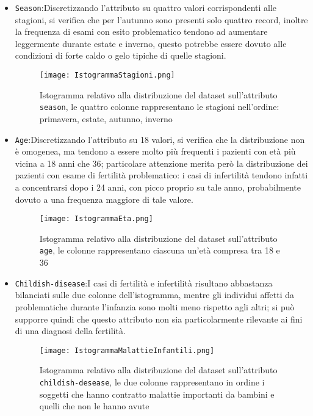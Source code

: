 \begin{itemize}
	\item \texttt{Season}:Discretizzando l'attributo su quattro valori corrispondenti alle stagioni, si verifica che per l'autunno sono presenti solo quattro record, inoltre la frequenza di esami con esito problematico tendono ad aumentare leggermente durante estate e inverno, questo potrebbe essere dovuto alle condizioni di forte caldo o gelo tipiche di quelle stagioni.
	\begin{figure}[H]
		\texttt{[image: IstogrammaStagioni.png]}
		\caption{Istogramma relativo alla distribuzione del dataset sull'attributo \texttt{season}, le quattro colonne rappresentano le stagioni nell'ordine: primavera, estate, autunno, inverno}
	\end{figure}
	
	\item \texttt{Age}:Discretizzando l'attributo su 18 valori, si verifica che la distribuzione non è omogenea, ma tendono a essere molto più frequenti i pazienti con età più vicina a 18 anni che  36; particolare attenzione merita però la distribuzione dei pazienti con esame di fertilità problematico: i casi di infertilità tendono infatti a concentrarsi dopo i 24 anni, con picco proprio su tale anno, probabilmente dovuto a una frequenza maggiore di tale valore.
	
		\begin{figure}[H]
		\texttt{[image: IstogrammaEta.png]}
		\caption{Istogramma relativo alla distribuzione del dataset sull'attributo \texttt{age}, le colonne rappresentano ciascuna un'età compresa tra 18 e 36}
	\end{figure}
	
	\item \texttt{Childish-disease}:I casi di fertilità e infertilità risultano abbastanza bilanciati sulle due colonne dell'istogramma, mentre gli individui affetti da problematiche durante l'infanzia sono molti meno rispetto agli altri; si può supporre quindi che questo attributo non sia particolarmente rilevante ai fini di una diagnosi della fertilità. 
	
	\begin{figure}[H]
		\texttt{[image: IstogrammaMalattieInfantili.png]}
		\caption{Istogramma relativo alla distribuzione del dataset sull'attributo \texttt{childish-desease}, le due colonne rappresentano in ordine i soggetti che hanno contratto malattie importanti da bambini e quelli che non le hanno avute}
	\end{figure}
	

\end{itemize}
